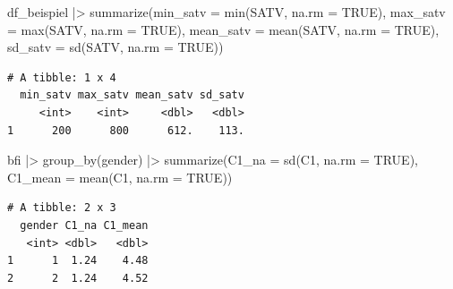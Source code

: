\documentclass[
  letterpaper,
  DIV=11,
  numbers=noendperiod]{scrreprt}
\newenvironment{Shaded}{\begin{snugshade}}{\end{snugshade}}
\newcommand{\AttributeTok}[1]{\textcolor[rgb]{0.40,0.45,0.13}{#1}}
\newcommand{\ConstantTok}[1]{\textcolor[rgb]{0.56,0.35,0.01}{#1}}
\newcommand{\FunctionTok}[1]{\textcolor[rgb]{0.28,0.35,0.67}{#1}}
\newcommand{\NormalTok}[1]{\textcolor[rgb]{0.00,0.23,0.31}{#1}}
\newcommand{\SpecialCharTok}[1]{\textcolor[rgb]{0.37,0.37,0.37}{#1}}
\begin{document}
\begin{tcolorbox}[enhanced jigsaw, toprule=.15mm, breakable, arc=.35mm, opacitybacktitle=0.6, titlerule=0mm, rightrule=.15mm, title=\textcolor{quarto-callout-tip-color}{\faLightbulb}\hspace{0.5em}{Lösung: Übung \texttt{summarize()}}, colbacktitle=quarto-callout-tip-color!10!white, coltitle=black, bottomrule=.15mm, colframe=quarto-callout-tip-color-frame, bottomtitle=1mm, toptitle=1mm, leftrule=.75mm, left=2mm, opacityback=0, colback=white]

\begin{Shaded}
\begin{Highlighting}[]
\NormalTok{df\_beispiel }\SpecialCharTok{|\textgreater{}} 
  \FunctionTok{summarize}\NormalTok{(}\AttributeTok{min\_satv =} \FunctionTok{min}\NormalTok{(SATV, }\AttributeTok{na.rm =} \ConstantTok{TRUE}\NormalTok{),}
            \AttributeTok{max\_satv =} \FunctionTok{max}\NormalTok{(SATV, }\AttributeTok{na.rm =} \ConstantTok{TRUE}\NormalTok{),}
            \AttributeTok{mean\_satv =} \FunctionTok{mean}\NormalTok{(SATV, }\AttributeTok{na.rm =} \ConstantTok{TRUE}\NormalTok{),}
            \AttributeTok{sd\_satv =} \FunctionTok{sd}\NormalTok{(SATV, }\AttributeTok{na.rm =} \ConstantTok{TRUE}\NormalTok{))}
\end{Highlighting}
\end{Shaded}

\begin{verbatim}
# A tibble: 1 x 4
  min_satv max_satv mean_satv sd_satv
     <int>    <int>     <dbl>   <dbl>
1      200      800      612.    113.
\end{verbatim}

\begin{Shaded}
\begin{Highlighting}[]
\NormalTok{bfi }\SpecialCharTok{|\textgreater{}} \FunctionTok{group\_by}\NormalTok{(gender) }\SpecialCharTok{|\textgreater{}} 
  \FunctionTok{summarize}\NormalTok{(}\AttributeTok{C1\_na =} \FunctionTok{sd}\NormalTok{(C1, }\AttributeTok{na.rm =} \ConstantTok{TRUE}\NormalTok{),}
            \AttributeTok{C1\_mean =} \FunctionTok{mean}\NormalTok{(C1, }\AttributeTok{na.rm =} \ConstantTok{TRUE}\NormalTok{))}
\end{Highlighting}
\end{Shaded}

\begin{verbatim}
# A tibble: 2 x 3
  gender C1_na C1_mean
   <int> <dbl>   <dbl>
1      1  1.24    4.48
2      2  1.24    4.52
\end{verbatim}

\end{tcolorbox}
\end{document}
